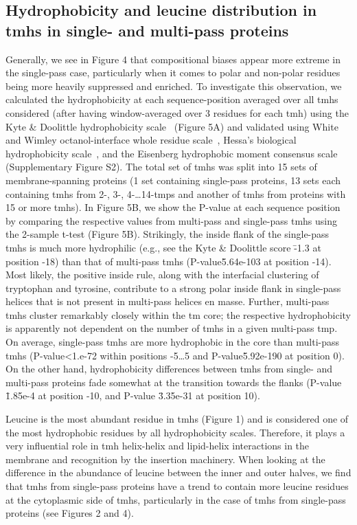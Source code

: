 \subsection{Hydrophobicity and leucine distribution in \gls{tmh}s in single- and multi-pass proteins}

Generally, we see in Figure 4 that compositional biases appear more extreme in the single-pass case, particularly when it comes to polar and non-polar residues being more heavily suppressed and enriched. To investigate this observation, we calculated the hydrophobicity at each sequence-position averaged over all \gls{tmh}s considered (after having window-averaged over 3 residues for each \gls{tmh}) using the Kyte \& Doolittle hydrophobicity scale~\cite{Kyte1982} (Figure 5A) and validated using White and Wimley octanol-interface whole residue scale~\cite{White1999}, Hessa’s biological hydrophobicity scale~\cite{Hessa2005}, and the Eisenberg hydrophobic moment consensus scale~\cite{Eisenberg1984} (Supplementary Figure S2). The total set of \gls{tmh}s was split into 15 sets of membrane-spanning proteins (1 set containing single-pass proteins, 13 sets each containing \gls{tmh}s from 2-, 3-, 4-\ldots 14-\gls{tmp}s and another of \gls{tmh}s from proteins with 15 or more \gls{tmh}s). In Figure 5B, we show the P-value at each sequence position by comparing the respective values from multi-pass and single-pass \gls{tmh}s using the 2-sample t-test (Figure 5B). Strikingly, the inside flank of the single-pass \gls{tmh}s is much more hydrophilic (e.g., see the Kyte \& Doolittle score \= -1.3 at position -18) than that of multi-pass \gls{tmh}s (P-value\=5.64e-103 at position -14). Most likely, the positive inside rule, along with the interfacial clustering of tryptophan and tyrosine, contribute to a strong polar inside flank in single-pass helices that is not present in multi-pass helices en masse. Further, multi-pass \gls{tmh}s cluster remarkably closely within the \gls{tm} core; the respective hydrophobicity is apparently not dependent on the number of \gls{tmh}s in a given multi-pass \gls{tmp}. On average, single-pass \gls{tmh}s are more hydrophobic in the core than multi-pass \gls{tmh}s (P-value<1.e-72 within positions -5…5 and P-value\=5.92e-190 at position 0). On the other hand, hydrophobicity differences between \gls{tmh}s from single- and multi-pass proteins fade somewhat at the transition towards the flanks (P-value \= 1.85e-4 at position -10, and P-value \= 3.35e-31 at position 10).

Leucine is the most abundant residue in \gls{tmh}s (Figure 1) and is considered one of the most hydrophobic residues by all hydrophobicity scales. Therefore, it plays a very influential role in \gls{tmh} helix-helix and lipid-helix interactions in the membrane and recognition by the insertion machinery. When looking at the difference in the abundance of leucine between the inner and outer halves, we find that \gls{tmh}s from single-pass proteins have a trend to contain more leucine residues at the cytoplasmic side of \gls{tmh}s, particularly in the case of \gls{tmh}s from single-pass proteins (see Figures 2 and 4).


